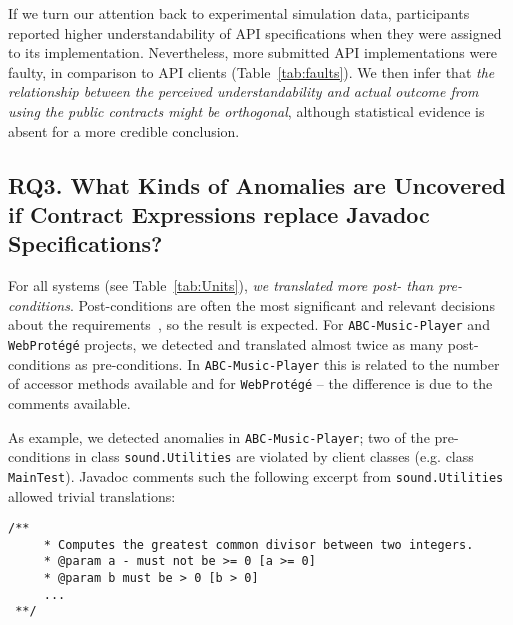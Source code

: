 If we turn our attention back to experimental simulation data, participants reported higher understandability of API specifications when they were assigned to its implementation. Nevertheless, more submitted API implementations were faulty, in comparison to API clients (Table~\ref{tab:faults}). 
We then infer that \emph{the relationship between the perceived understandability and actual outcome from using the public contracts might be orthogonal}, although statistical evidence is absent for a more credible conclusion. 


\subsection{RQ3. What Kinds of Anomalies are Uncovered if Contract Expressions replace Javadoc Specifications?}
\label{rq3}


For all systems (see Table~\ref{tab:Units}), \emph{we
translated more post- than pre-conditions}. 
Post-conditions are often the most significant and relevant decisions about the requirements~\cite{Rosenblum,sac2017}, so the result is expected. 
For \texttt{ABC-Music-Player} and
\texttt{WebProt\'{e}g\'{e}} projects, we detected and translated almost twice as many post-conditions as pre-conditions.
In \texttt{ABC-Music-Player} this is related to the number of accessor methods available and for \texttt{WebProt\'{e}g\'{e}} -- the difference is due to the comments available.





As example, we detected anomalies in \texttt{ABC-Mu\-sic-Player}; two of the pre-conditions in class \texttt{sound.Utilities} are violated by client classes (e.g. class \texttt{MainTest}). Javadoc comments such the following excerpt from \texttt{sound.Utilities} allowed trivial translations:
\begin{lstlisting}[basicstyle=\footnotesize\ttfamily,name=figxpi, frame=lines, mathescape=true]
 /**
     * Computes the greatest common divisor between two integers.
     * @param a - must not be >= 0 [a >= 0]
     * @param b must be > 0 [b > 0]
     ...
 **/  
\end{lstlisting}


